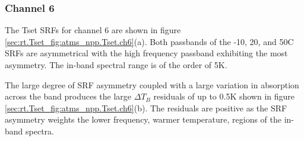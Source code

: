 \subsubsection{Channel 6}
The Tset SRFs for channel 6 are shown in figure \ref{sec:rt.Tset_fig:atms_npp.Tset.ch6}(a). Both passbands of the -10, 20, and 50\textdegree{}C SRFs are asymmetrical with the high frequency passband exhibiting the most asymmetry. The in-band spectral range is of the order of 5K.

The large degree of SRF asymmetry coupled with a large variation in absorption across the band produces the large $\Delta T_B$ residuals of up to 0.5K shown in figure \ref{sec:rt.Tset_fig:atms_npp.Tset.ch6}(b). The residuals are positive as the SRF asymmetry weights the lower frequency, warmer temperature, regions of the in-band spectra. 
